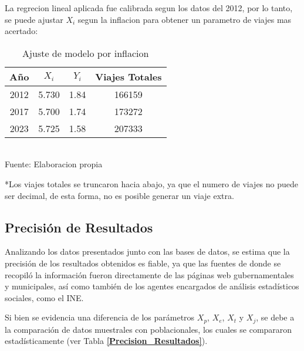 \documentclass[12pt]{article} %
\begin{document}
La regrecion lineal aplicada fue calibrada segun los datos del 2012, por lo tanto, se puede ajustar $X_i$ segun la inflacion para obtener un parametro de viajes mas acertado:



\begin{table}[H]
    \centering
    \caption{Ajuste de modelo por inflacion}
    \vspace{0.2cm}
    \begin{tabular}{|c|c|c|c|}
        \hline
        Año & $X_i$ & $Y_i$ & Viajes Totales \\
        \hline
        2012 & 5.730 & 1.84 & 166159\\
        2017 & 5.700 & 1.74 & 173272\\
        2023 & 5.725 & 1.58 & 207333\\
        \hline
    \end{tabular}
    \vspace{0.2cm}
    \\Fuente: Elaboracion propia
\end{table}

*Los viajes totales se truncaron hacia abajo, ya que el numero de viajes no puede ser decimal, de esta forma, no es posible generar un viaje extra.

\subsection{Precisión de Resultados}

Analizando los datos presentados junto con las bases de datos, se estima que la precisión de los resultados obtenidos es fiable, ya que 
las fuentes de donde se recopiló la información fueron directamente de las páginas web 
gubernamentales y municipales, así como también de los agentes encargados de análisis estadísticos sociales, como el INE.

Si bien se evidencia una diferencia de los parámetros $X_p$, $X_e$, $X_t$ y $X_j$, se debe a la comparación de datos muestrales
con poblacionales, los cuales se compararon estadísticamente (ver Tabla \textbf{\ref{Precision_Resultados}}).
\end{document}
